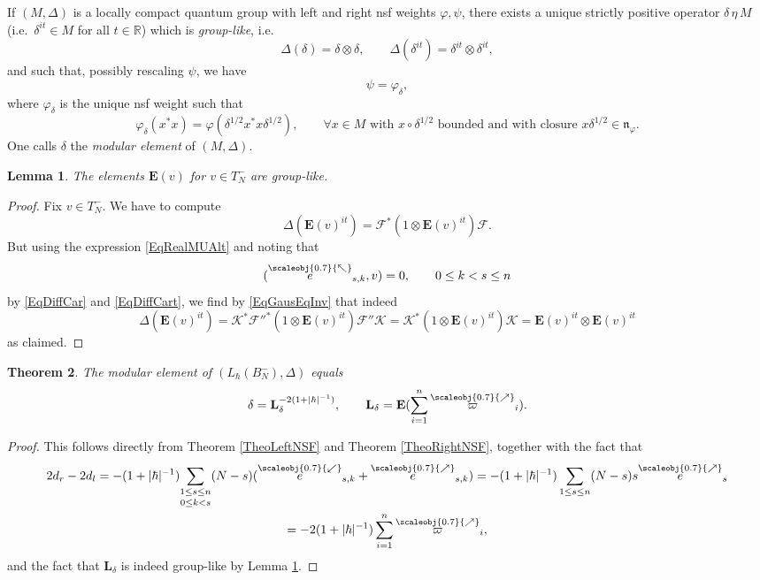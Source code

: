 \documentclass[11pt, reqno]{amsart}
\newtheorem{theorem}{Theorem}[section]
\newtheorem{lemma}[theorem]{Lemma}
\theoremstyle{definition}
\numberwithin{equation}{section}
\def\R{\mathbb R}
\newcommand{\Kc}{\mathcal{K}}
\newcommand{\Fct}{\mathcal{F}}
\newcommand{\Fctt}{\mathcal{F}''}
\newcommand{\Bor}{B}
\newcommand{\Tor}{T}
\newcommand{\nears}{\scaleobj{0.7}{\nearrow}}
\newcommand{\nwars}{\scaleobj{0.7}{\nwarrow}}
\newcommand{\swars}{\scaleobj{0.7}{\swarrow}}
\newcommand{\nee}{\overset{\nears}{e}}
\newcommand{\nwe}{\overset{\nwars}{e}}
\newcommand{\swe}{\overset{\swars}{e}}
\newcommand{\nevarpi}{\overset{\nears}{\varpi}}
\newcommand{\Eb}{\mathbf{E}}
\newcommand{\Lb}{\mathbf{L}}
\newcommand{\mfn}{\mathfrak{n}}
\begin{document}
If $(M,\Delta)$ is a locally compact quantum group with left and right nsf weights $\varphi,\psi$, there exists a unique strictly positive operator $\delta\,\eta\,M$ (i.e.\ $\delta^{it}\in M$ for all $t\in \R$) which is \emph{group-like}, i.e.\
\[
\Delta(\delta) = \delta\otimes \delta,\qquad \Delta(\delta^{it}) = \delta^{it}\otimes \delta^{it},
\]
and such that, possibly rescaling $\psi$, we have
\[
\psi = \varphi_{\delta},
\]
where $\varphi_{\delta}$ is the unique nsf weight such that 
\begin{equation}\label{EqVarphidelta}
\varphi_{\delta}(x^*x) = \varphi(\delta^{1/2}x^*x \delta^{1/2}),\qquad \forall x \in M\textrm{ with }x\circ \delta^{1/2} \textrm{ bounded and with closure }x\delta^{1/2} \in \mfn_{\varphi}.
\end{equation}
One calls $\delta$ the \emph{modular element} of $(M,\Delta)$.

\begin{lemma}\label{LemGrouplike}
The elements $\Eb(v)$ for $v \in \Tor_N^-$ are group-like.
\end{lemma}
\begin{proof}
Fix $v\in \Tor_N^-$. We have to compute 
\[
\Delta(\Eb(v)^{it}) = \Fct^*(1\otimes \Eb(v)^{it})\Fct.
\]
But using the expression \eqref{EqRealMUAlt} and noting that 
\[
(\nwe_{s,k},v)=0,\qquad 0\leq k <s\leq n
\]
by \eqref{EqDiffCar} and \eqref{EqDiffCart}, we find by \eqref{EqGausEqInv} that indeed
\[
\Delta(\Eb(v)^{it}) = \Kc^* \Fctt^*(1\otimes \Eb(v)^{it})\Fctt\Kc = \Kc^*(1\otimes \Eb(v)^{it}) \Kc = \Eb(v)^{it}\otimes \Eb(v)^{it}
\]
as claimed. 
\end{proof}
 
\begin{theorem}
The modular element of $(L_{\hbar}(\Bor_N^-),\Delta)$ equals 
\begin{equation}\label{EqModEl}
\delta = \Lb_{\delta}^{-2(1+|\hbar|^{-1})},\qquad \Lb_{\delta} = \Eb(\sum_{i=1}^n \nevarpi_i).
\end{equation}
\end{theorem}
\begin{proof}
This follows directly from Theorem \ref{TheoLeftNSF} and Theorem \ref{TheoRightNSF}, together with the fact that
\begin{multline*}
2d_r-2d_l = -(1+|\hbar|^{-1})\underset{0\leq k<s}{\sum_{1\leq s\leq n}} (N-s)(\swe_{s,k}  + \nee_{s,k}) =- (1+|\hbar|^{-1})\sum_{1\leq s\leq n} (N-s)s\nee_s \\ =- 2(1+|\hbar|^{-1})\sum_{i=1}^n \nevarpi_i,
\end{multline*}
and the fact that $\Lb_{\delta}$ is indeed group-like by Lemma \ref{LemGrouplike}.
\end{proof}
\end{document}
